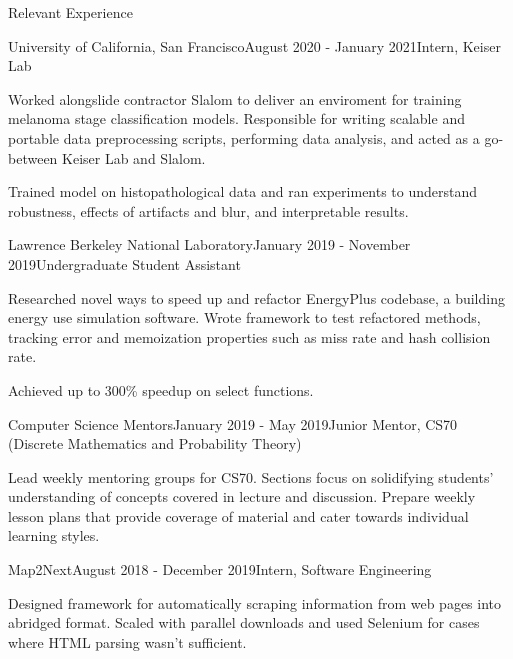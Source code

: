 \documentclass{resume}
\begin{document}
\begin{rSection}{Relevant Experience}

\begin{rSubsection}{University of California, San Francisco}{August 2020 - January 2021}{Intern, Keiser Lab}{}
\item Worked alongslide contractor Slalom to deliver an enviroment for training melanoma stage classification models. Responsible for writing scalable and portable data preprocessing scripts, performing data analysis, and acted as a go-between Keiser Lab and Slalom.
\item Trained model on histopathological data and ran experiments to understand robustness, effects of artifacts and blur, and interpretable results.
\end{rSubsection}

\begin{rSubsection}{Lawrence Berkeley National Laboratory}{January 2019 - November 2019}{Undergraduate Student Assistant}{}
\item Researched novel ways to speed up and refactor EnergyPlus codebase, a building energy use simulation software. Wrote framework to test refactored methods, tracking
error and memoization properties such as miss rate and hash collision rate. 
\item Achieved up to 300\% speedup on select functions. 
\end{rSubsection}



\begin{rSubsection}{Computer Science Mentors}{January 2019 - May 2019}{Junior Mentor, CS70 (Discrete Mathematics and Probability Theory)}{}
\item Lead weekly mentoring groups for CS70. Sections focus on solidifying students’ understanding of concepts covered in lecture and discussion. Prepare weekly lesson plans that provide coverage of material and cater towards individual learning
styles.
\end{rSubsection}

\begin{rSubsection}{Map2Next}{August 2018 - December 2019}{Intern, Software Engineering}{}
\item Designed framework for automatically scraping information from web pages into abridged format. Scaled with parallel downloads and used Selenium for cases where HTML parsing wasn't sufficient.
\end{rSubsection}

\end{rSection}
\end{document}
